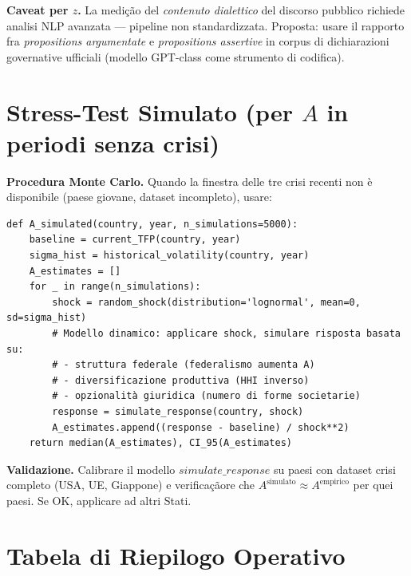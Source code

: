 \Conj{} \textbf{Caveat per \(z\).} La medição del \emph{contenuto
dialettico} del discorso pubblico richiede analisi NLP avanzata ---
pipeline non standardizzata. Proposta: usare il rapporto fra
\emph{propositions argumentate} e \emph{propositions assertive} in
corpus di dichiarazioni governative ufficiali (modello GPT-class come
strumento di codifica).



\section{\texorpdfstring{Stress-Test Simulato (per \(A\) in periodi
senza
crisi)}{Stress-Test Simulato (per A in periodi senza crisi)}}\label{stress-test-simulato-per-a-in-periodi-senza-crisi}

\Hypoth{} \textbf{Procedura Monte Carlo.} Quando la finestra delle tre
crisi recenti non è disponibile (paese giovane, dataset incompleto),
usare:

\begin{verbatim}
def A_simulated(country, year, n_simulations=5000):
    baseline = current_TFP(country, year)
    sigma_hist = historical_volatility(country, year)
    A_estimates = []
    for _ in range(n_simulations):
        shock = random_shock(distribution='lognormal', mean=0, sd=sigma_hist)
        # Modello dinamico: applicare shock, simulare risposta basata su:
        # - struttura federale (federalismo aumenta A)
        # - diversificazione produttiva (HHI inverso)
        # - opzionalità giuridica (numero di forme societarie)
        response = simulate_response(country, shock)
        A_estimates.append((response - baseline) / shock**2)
    return median(A_estimates), CI_95(A_estimates)
\end{verbatim}

\Proved{} \textbf{Validazione.} Calibrare il modello
\(simulate\_response\) su paesi con dataset crisi completo (USA, UE,
Giappone) e verificaçãore che
\(A^{\text{simulato}} \approx A^{\text{empirico}}\) per quei paesi. Se
OK, applicare ad altri Stati.



\section{Tabela di Riepilogo
Operativo}\label{tabela-di-riepilogo-operativo}

